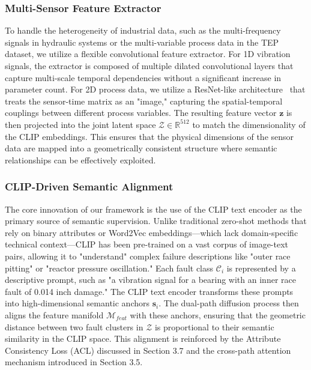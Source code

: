 \subsubsection{Multi-Sensor Feature Extractor}
To handle the heterogeneity of industrial data, such as the multi-frequency signals in hydraulic systems or the multi-variable process data in the TEP dataset, we utilize a flexible convolutional feature extractor. For 1D vibration signals, the extractor is composed of multiple dilated convolutional layers that capture multi-scale temporal dependencies without a significant increase in parameter count. For 2D process data, we utilize a ResNet-like architecture~\cite{he2016deep} that treats the sensor-time matrix as an "image," capturing the spatial-temporal couplings between different process variables. The resulting feature vector $\mathbf{z}$ is then projected into the joint latent space $\mathcal{Z} \in \mathbb{R}^{512}$ to match the dimensionality of the CLIP embeddings. This ensures that the physical dimensions of the sensor data are mapped into a geometrically consistent structure where semantic relationships can be effectively exploited.

\subsubsection{CLIP-Driven Semantic Alignment}
The core innovation of our framework is the use of the CLIP text encoder as the primary source of semantic supervision. Unlike traditional zero-shot methods that rely on binary attributes or Word2Vec embeddings—which lack domain-specific technical context—CLIP has been pre-trained on a vast corpus of image-text pairs, allowing it to "understand" complex failure descriptions like "outer race pitting" or "reactor pressure oscillation." Each fault class $\mathcal{C}_i$ is represented by a descriptive prompt, such as "a vibration signal for a bearing with an inner race fault of 0.014 inch damage." The CLIP text encoder transforms these prompts into high-dimensional semantic anchors $\mathbf{s}_i$. The dual-path diffusion process then aligns the feature manifold $\mathcal{M}_{feat}$ with these anchors, ensuring that the geometric distance between two fault clusters in $\mathcal{Z}$ is proportional to their semantic similarity in the CLIP space. This alignment is reinforced by the Attribute Consistency Loss (ACL) discussed in Section 3.7 and the cross-path attention mechanism introduced in Section 3.5.

